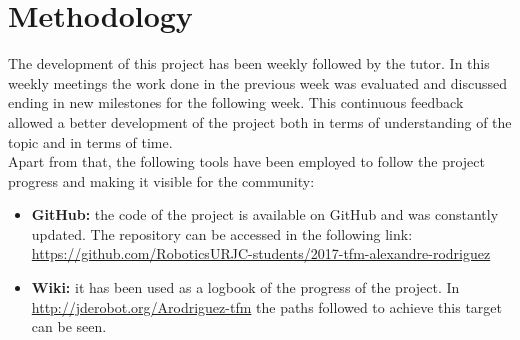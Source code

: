 \section{Methodology}
The development of this project has been weekly followed by the tutor. In this weekly meetings the work done in the previous week was evaluated and discussed ending in new milestones for the following week. This continuous feedback allowed a better development of the project both in terms of understanding of the topic and in terms of time.\\
Apart from that, the following tools have been employed to follow the project progress and making it visible for the community:
\begin{itemize}
    \item \textbf{GitHub:} the code of the project is available on GitHub and was constantly updated. The repository can be accessed in the following link: \url{https://github.com/RoboticsURJC-students/2017-tfm-alexandre-rodriguez}
    \item \textbf{Wiki:} it has been used as a logbook of the progress of the project. In \url{http://jderobot.org/Arodriguez-tfm} the paths followed to achieve this target can be seen.
\end{itemize}